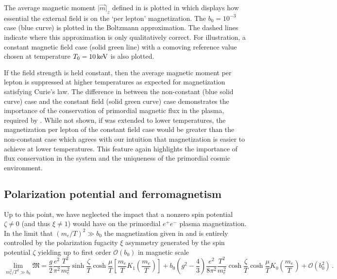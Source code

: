 The average magnetic moment $\vert\vec{m}\vert_{z}$ defined in  is plotted in  which displays how essential the external field is on the `per lepton' magnetization. The $b_{0}=10^{-3}$ case (blue curve) is plotted in the Boltzmann approximation. The dashed lines indicate where this approximation is only qualitatively correct. For illustration, a constant magnetic field case (solid green line) with a comoving reference value chosen at temperature $T_{0}=10\text{\,keV}$ is also plotted.

If the field strength is held constant, then the average magnetic moment per lepton is suppressed at higher temperatures as expected for magnetization satisfying Curie's law. The difference in  between the non-constant (blue solid curve) case and the constant field (solid green curve) case demonstrates the importance of the conservation of primordial magnetic flux in the plasma, required by . While not shown, if  was extended to lower temperatures, the magnetization per lepton of the constant field case would be greater than the non-constant case which agrees with our intuition that magnetization is easier to achieve at lower temperatures. This feature again highlights the importance of flux conservation in the system and the uniqueness of the primordial cosmic environment.

\subsection{Polarization potential and ferromagnetism}
\label{sec:ferro}
\noindent Up to this point, we have neglected the impact that a nonzero spin potential $\zeta\neq0$ (and thus $\xi\neq1$) would have on the primordial $e^{+}e^{-}$ plasma magnetization. In the limit that $(m_{e}/T)^2\gg b_0$ the magnetization given in  and  is entirely controlled by the polarization fugacity $\xi$ asymmetry generated by the spin potential $\zeta$ yielding up to first order $\mathcal{O}(b_{0})$ in magnetic scale
\begin{equation}
 \label{ferro}
 \lim_{m_{e}^{2}/T^{2}\gg b_0}{\mathfrak M}=\frac{g}{2}\frac{e^{2}}{\pi^{2}}\frac{T^{2}}{m_{e}^{2}}\sinh{\frac{\zeta}{T}}\cosh{\frac{\mu}{T}}\left[\frac{m_{e}}{T}K_{1}\left(\frac{m_{e}}{T}\right)\right] 
 +b_{0}\left(g^{2}-\frac{4}{3}\right)\frac{e^{2}}{8\pi^{2}}\frac{T^{2}}{m_{e}^{2}}\cosh{\frac{\zeta}{T}}\cosh{\frac{\mu}{T}}K_{0}\left(\frac{m_{e}}{T}\right)
 +\mathcal{O}\left(b_{0}^{2}\right)\,.
\end{equation}

